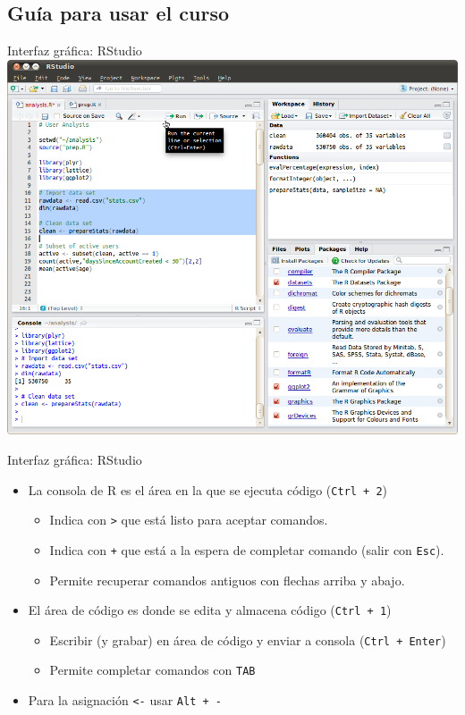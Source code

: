 \documentclass[xcolor={usenames,svgnames,dvipsnames}]{beamer}
\begin{document}
\subsection{Guía para usar el curso}
\label{sec-1-2}

\begin{frame}[plain,label=sec-1-2-1]{Interfaz gráfica: RStudio}
\includegraphics[width=1.05\textwidth]{figs/rstudio-ubuntu.png}
\end{frame}

\begin{frame}[fragile,label=sec-1-2-2]{Interfaz gráfica: RStudio}
 \begin{itemize}
\item La consola de R es el área en la que se ejecuta código (\texttt{Ctrl + 2})
\begin{itemize}
\item Indica con \texttt{>} que está listo para aceptar comandos.
\item Indica con \texttt{+} que está a la espera de completar comando (salir con \texttt{Esc}).
\item Permite recuperar comandos antiguos con flechas arriba y abajo.
\end{itemize}
\item El área de código es donde se edita y almacena código (\texttt{Ctrl + 1})
\begin{itemize}
\item Escribir (y grabar) en área de código y enviar a consola (\texttt{Ctrl + Enter})
\item Permite completar comandos con \texttt{TAB}
\end{itemize}
\item Para la asignación \texttt{<-} usar \texttt{Alt + -}
\end{itemize}
\end{frame}
\end{document}
